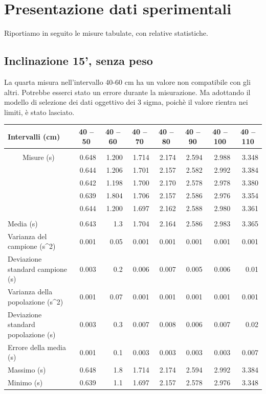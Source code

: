 \documentclass[12pt]{article} %
\begin{document}
\newpage
\section{Presentazione dati sperimentali}	
	Riportiamo in seguito le misure tabulate, con relative statistiche.
	\subsection {Inclinazione 15', senza peso}
		La quarta misura nell'intervallo 40-60 cm ha un valore non compatibile con gli altri. Potrebbe esserci stato un errore durante la misurazione. 
		Ma adottando il modello di selezione dei dati oggettivo dei 3 sigma, poichè il valore rientra nei limiti, è
		stato lasciato.
		\begin{table}[H]
			\begin{tabular}{|l|r|r|r|r|r|r|r|}
			\hline
			Intervalli (cm) & \multicolumn{1}{c|}{40 – 50} & \multicolumn{1}{c|}{40 – 60} & \multicolumn{1}{c|}{40 – 70} & \multicolumn{1}{c|}{40 – 80 } & \multicolumn{1}{c|}{40 – 90} & \multicolumn{1}{c|}{40 – 100} & \multicolumn{1}{c|}{40 – 110} \\ \hline
			 & \multicolumn{ 7}{l|}{} \\ \hline
			\multicolumn{ 1}{|c|}{Misure (s)} & 0.648 & 1.200 & 1.714 & 2.174 & 2.594 & 2.988 & 3.348 \\ \cline{ 2- 8}
			\multicolumn{ 1}{|l|}{} & 0.644 & 1.206 & 1.701 & 2.157 & 2.582 & 2.992 & 3.384 \\ \cline{ 2- 8}
			\multicolumn{ 1}{|l|}{} & 0.642 & 1.198 & 1.700 & 2.170 & 2.578 & 2.978 & 3.380 \\ \cline{ 2- 8}
			\multicolumn{ 1}{|l|}{} & 0.639 & 1.804 & 1.706 & 2.157 & 2.586 & 2.976 & 3.354 \\ \cline{ 2- 8}
			\multicolumn{ 1}{|l|}{} & 0.644 & 1.200 & 1.697 & 2.162 & 2.588 & 2.980 & 3.361 \\ \hline
			 & \multicolumn{ 7}{c|}{} \\ \hline
			Media (s) & 0.643 & 1.3 & 1.704 & 2.164 & 2.586 & 2.983 & 3.365 \\ \hline
			Varianza del campione (s^2) & 0.001 & 0.05 & 0.001 & 0.001 & 0.001 & 0.001 & 0.001 \\ \hline
			Deviazione standard campione (s) & 0.003 & 0.2 & 0.006 & 0.007 & 0.005 & 0.006 & 0.01 \\ \hline
			Varianza della popolazione (s^2) & 0.001 & 0.07 & 0.001 & 0.001 & 0.001 & 0.001 & 0.001 \\ \hline
			Deviazione standard popolazione (s) & 0.003 & 0.3 & 0.007 & 0.008 & 0.006 & 0.007 & 0.02 \\ \hline
			Errore della media (s) & 0.001 & 0.1 & 0.003 & 0.003 & 0.003 & 0.003 & 0.007 \\ \hline
			Massimo (s) & 0.648 & 1.8 & 1.714 & 2.174 & 2.594 & 2.992 & 3.384 \\ \hline
			Minimo (s) & 0.639 & 1.1 & 1.697 & 2.157 & 2.578 & 2.976 & 3.348 \\ \hline
			\end{tabular}
		\label{15n}
		\end{table}
\end{document}
